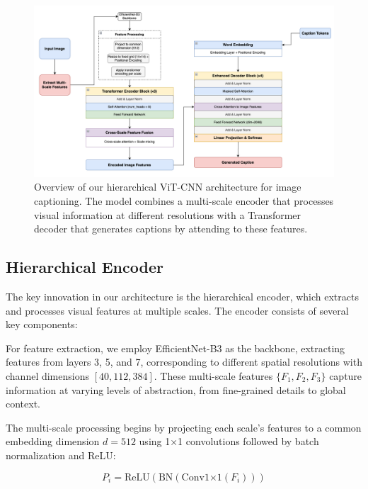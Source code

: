 \documentclass[10pt,twocolumn,letterpaper]{article}
\begin{document}
\begin{figure}[ht!]
\begin{center}
\includegraphics[width=\textwidth]{figures/architecture.png}
\end{center}
\caption{Overview of our hierarchical ViT-CNN architecture for image captioning. The model combines a multi-scale encoder that processes visual information at different resolutions with a Transformer decoder that generates captions by attending to these features.}
\label{fig:architecture}
\end{figure}

\subsection{Hierarchical Encoder}

The key innovation in our architecture is the hierarchical encoder, which extracts and processes visual features at multiple scales. The encoder consists of several key components:

For feature extraction, we employ EfficientNet-B3 as the backbone, extracting features from layers 3, 5, and 7, corresponding to different spatial resolutions with channel dimensions $[40, 112, 384]$. These multi-scale features $\{F_1, F_2, F_3\}$ capture information at varying levels of abstraction, from fine-grained details to global context.

The multi-scale processing begins by projecting each scale's features to a common embedding dimension $d=512$ using 1×1 convolutions followed by batch normalization and ReLU:

\begin{equation}
P_i = \text{ReLU}(\text{BN}(\text{Conv1×1}(F_i)))
\end{equation}
\end{document}
